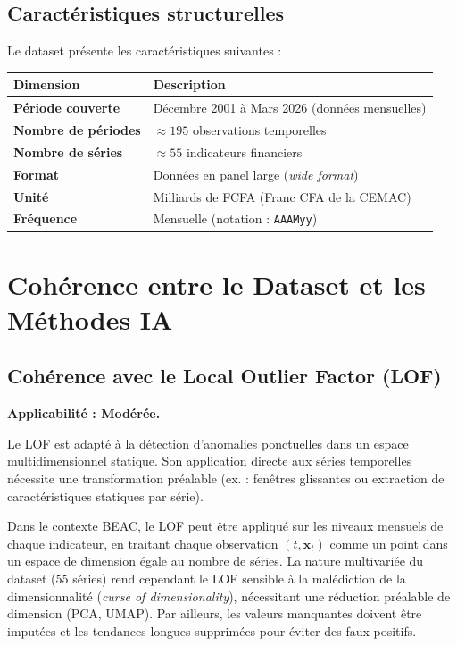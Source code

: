 \documentclass[12pt, a4paper]{article}
\begin{document}
\subsection{Caractéristiques structurelles}

Le dataset présente les caractéristiques suivantes :

\begin{longtable}{>{\bfseries}p{4.5cm} p{9cm}}
\toprule
\textbf{Dimension} & \textbf{Description} \\
\midrule
\endhead
Période couverte & Décembre 2001 à Mars 2026 (données mensuelles)\\
Nombre de périodes & $\approx 195$ observations temporelles\\
Nombre de séries & $\approx 55$ indicateurs financiers\\
Format & Données en panel large (\textit{wide format})\\
Unité & Milliards de FCFA (Franc CFA de la CEMAC)\\
Fréquence & Mensuelle (notation : \texttt{AAAMyy})\\
\bottomrule
\end{longtable}
\section{Cohérence entre le Dataset et les Méthodes IA}
\label{sec:coherence}

\subsection{Cohérence avec le Local Outlier Factor (LOF)}

\textbf{Applicabilité : Modérée.}

Le LOF est adapté à la détection d'anomalies ponctuelles dans un espace
multidimensionnel statique. Son application directe aux séries temporelles
nécessite une transformation préalable (ex. : fenêtres glissantes ou
extraction de caractéristiques statiques par série).

Dans le contexte BEAC, le LOF peut être appliqué sur les niveaux mensuels
de chaque indicateur, en traitant chaque observation $(t, \mathbf{x}_t)$
comme un point dans un espace de dimension égale au nombre de séries.
La nature multivariée du dataset (55 séries) rend cependant le LOF
sensible à la malédiction de la dimensionnalité (\textit{curse of
dimensionality}), nécessitant une réduction préalable de dimension (PCA,
UMAP). Par ailleurs, les valeurs manquantes doivent être imputées et
les tendances longues supprimées pour éviter des faux positifs.
\end{document}
